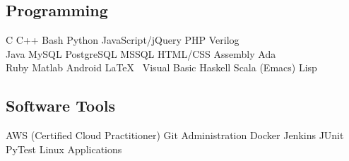 \documentclass[]{deedy-resume-openfont}
\begin{document}
\subsection{Programming}
C \textbullet{} C++ \textbullet{} Bash \textbullet{} Python \textbullet{} JavaScript/jQuery \textbullet{} PHP \textbullet{} Verilog \\
Java \textbullet{} MySQL \textbullet{} PostgreSQL \textbullet{} MSSQL \textbullet{} HTML/CSS \textbullet{} Assembly \textbullet{} Ada \\
Ruby \textbullet{} Matlab \textbullet{} Android \textbullet{} \LaTeX\ \textbullet{} Visual Basic \textbullet{} Haskell \textbullet{} Scala \textbullet{} (Emacs) Lisp
\sectionsep

\subsection{Software Tools}
AWS (Certified Cloud Practitioner) \textbullet{} Git Administration \textbullet{} Docker \textbullet{} Jenkins \textbullet{} JUnit \textbullet{} PyTest \textbullet{} Linux Applications


\end{document}
